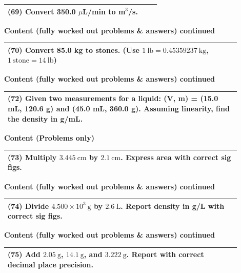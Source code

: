 \documentclass{article}
\begin{document}
\begin{tabular}{|p{0.9\linewidth}|}
\hline
\vspace{0.2cm}

\textbf{(69)} Convert 350.0 $\mu$L/min to m$^3$/s. \\
\hline
\end{tabular}
\newpage
\noindent
{\large \textbf{Content (fully worked out problems \& answers) continued}} \\[0.2em]
\begin{tabular}{|p{0.9\linewidth}|}
\hline
\vspace{0.2cm}

\textbf{(70)} Convert 85.0 kg to stones. (Use $1~\text{lb}=0.45359237~\text{kg}$, $1~\text{stone}=14~\text{lb}$) \\
\hline
\end{tabular}
\newpage
\noindent
{\large \textbf{Content (fully worked out problems \& answers) continued}} \\[0.2em]

\begin{tabular}{|p{0.9\linewidth}|}
\hline
\vspace{0.2cm}

\textbf{(72)} Given two measurements for a liquid: (V, m) = (15.0 mL, 120.6 g) and (45.0 mL, 360.0 g). Assuming linearity, find the density in g/mL. \\
\hline
\end{tabular}
\newpage
\noindent
{\large \textbf{Content (Problems only)}} \\[0.2em]

\begin{tabular}{|p{0.9\linewidth}|}
\hline
\vspace{0.2cm}
\textbf{(73)} Multiply $3.445~\text{cm}$ by $2.1~\text{cm}$. Express area with correct sig figs. \\
\hline
\end{tabular}
\newpage

\noindent
{\large \textbf{Content (fully worked out problems \& answers) continued}} \\[0.2em]
\begin{tabular}{|p{0.9\linewidth}|}
\hline
\vspace{0.2cm}
\textbf{(74)} Divide $4.500 \times 10^3~\text{g}$ by $2.6~\text{L}$. Report density in g/L with correct sig figs. \\
\hline
\end{tabular}
\newpage

\noindent
{\large \textbf{Content (fully worked out problems \& answers) continued}} \\[0.2em]
\begin{tabular}{|p{0.9\linewidth}|}
\hline
\vspace{0.2cm}
\textbf{(75)} Add $2.05~\text{g}$, $14.1~\text{g}$, and $3.222~\text{g}$. Report with correct decimal place precision. \\
\hline
\end{tabular}
\newpage
\end{document}
